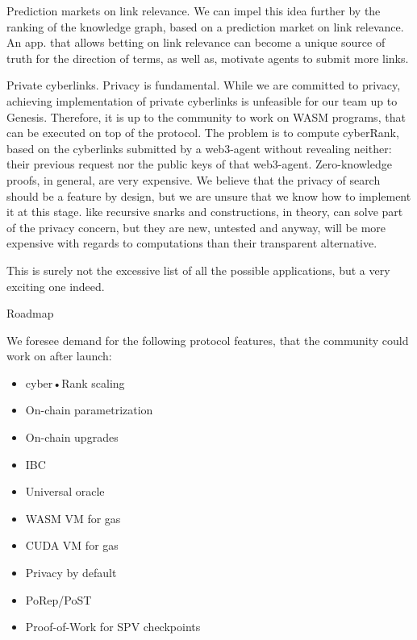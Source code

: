\documentclass[8pt,oneside]{amsart}
\makeatletter
\newcommand{\linkgreen}[2]{\href{#1}{\color{green}{#2}}}
\renewcommand\subsection{\@startsection{subsection}
                                    {2}{\z@}
                                    {-3.25ex\@plus -1ex \@minus -.2ex}
                                    {0ex \@plus .2ex}
                                    {\play\Large}
                        }
\newcommand{\titleSection}[1]{\subsection{#1}}
\newcommand{\code}[1]{{\PlayBold #1}}
\makeatother
\begin{document}
\code{Prediction markets on link relevance}. We can impel this idea further by the ranking of the knowledge graph, based on a prediction market on link relevance. An app. that allows betting on link relevance can become a unique source of truth for the direction of terms, as well as, motivate agents to submit more links.

\code{Private cyberlinks}. Privacy is fundamental. While we are committed to privacy, achieving implementation of private cyberlinks is unfeasible for our team up to Genesis. Therefore, it is up to the community to work on WASM programs, that can be executed on top of the protocol. The problem is to compute cyberRank, based on the cyberlinks submitted by a web3-agent without revealing neither: their previous request nor the public keys of that web3-agent. Zero-knowledge proofs, in general, are very expensive. We believe that the privacy of search should be a feature by design, but we are unsure that we know how to implement it at this stage. \linkgreen{https://ipfs.io/ipfs/Qmdje3AmtsfjX9edWAxo3LFhV9CTAXoUvwGR7wHJXnc2Gk}{Coda} like recursive snarks and \linkgreen{https://ipfs.io/ipfs/Qmd99xmraYip9cVv8gRMy6Y97Bkij8qUYArGDME7CzFasg}{MimbleWimble} constructions, in theory, can solve part of the privacy concern, but they are new, untested and anyway, will be more expensive with regards to computations than their transparent alternative.

This is surely not the excessive list of all the possible applications, but a very exciting one indeed.

\titleSection{Roadmap}\label{Roadmap}

We foresee demand for the following protocol features, that the community could work on after launch:

\begin{itemize}
\item cyber•Rank scaling
\item On-chain parametrization
\item On-chain upgrades
\item IBC
\item Universal oracle
\item WASM VM for gas
\item CUDA VM for gas
\item Privacy by default
\item PoRep/PoST
\item Proof-of-Work for SPV checkpoints

\end{itemize}
\end{document}
